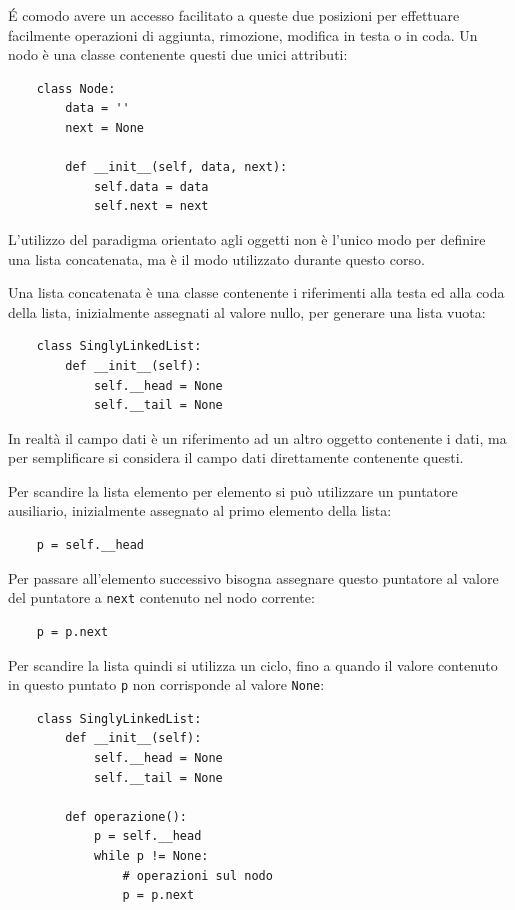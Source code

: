 \documentclass{article}
\numberwithin{equation}{subsection}
\begin{document}
\'{E} comodo avere un accesso facilitato a queste due posizioni per effettuare facilmente operazioni di aggiunta, rimozione, 
modifica in testa o in coda. Un nodo è una classe contenente questi due unici attributi:
\begin{verbatim}
    class Node:
        data = ''
        next = None

        def __init__(self, data, next):
            self.data = data
            self.next = next
\end{verbatim}

L'utilizzo del paradigma orientato agli oggetti non è l'unico modo per definire una lista concatenata, ma è il modo 
utilizzato durante questo corso. 

Una lista concatenata è una classe contenente i riferimenti alla testa ed alla coda della lista, inizialmente 
assegnati al valore nullo, per generare una lista vuota:
\begin{verbatim}
    class SinglyLinkedList:
        def __init__(self):
            self.__head = None
            self.__tail = None
\end{verbatim}

In realtà il campo dati è un riferimento ad un altro oggetto contenente i dati, ma per semplificare si considera il campo 
dati direttamente contenente questi. 

Per scandire la lista elemento per elemento si può utilizzare un puntatore ausiliario, inizialmente assegnato al 
primo elemento della lista:
\begin{verbatim}
    p = self.__head
\end{verbatim}
Per passare all'elemento successivo bisogna assegnare questo puntatore al valore del puntatore a \verb|next| contenuto 
nel nodo corrente:
\begin{verbatim}
    p = p.next
\end{verbatim}

Per scandire la lista quindi si utilizza un ciclo, fino a quando il valore contenuto in questo puntato \verb|p| non 
corrisponde al valore \verb|None|:
\begin{verbatim}
    class SinglyLinkedList:
        def __init__(self):
            self.__head = None
            self.__tail = None

        def operazione():
            p = self.__head
            while p != None:
                # operazioni sul nodo
                p = p.next
\end{verbatim}
\end{document}
